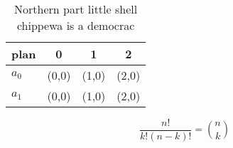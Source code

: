 \documentclass[a4paper]{article}
\begin{document}
\begin{table}
\begin{adjustbox}{width=0.6\columnwidth}
\begin{tabular}{|l|l|l|l|}
\hline
\textbf{plan} & \multicolumn{1}{c|}{\textbf{0}} & \multicolumn{1}{c|}{\textbf{1}} & \multicolumn{1}{c|}{\textbf{2}} \\ \hline
\textbf{$a_0$}  & (0,0) & (1,0) & (2,0) \\ \hline
\textbf{$a_1$}  & (0,0) & (1,0) & (2,0) \\ \hline
\end{tabular}
\end{adjustbox}
\caption{Northern part little shell chippewa is a democrac
}
\end{table}

\[ \frac{n!}{k!(n-k)!} = \binom{n}{k} \]
\end{document}
